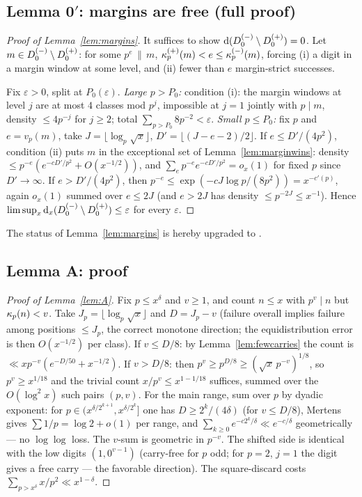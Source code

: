 \subsection{Lemma 0$'$: margins are free (full proof)}

\begin{proof}[Proof of Lemma~\ref{lem:margins}]
It suffices to show $\operatorname{d}(D_0^{(-)}\setminus D_0^{(+)})=0$. Let
$m\in D_0^{(-)}\setminus D_0^{(+)}$: for some $p^{e}\,\|\,m$,
$\kappa^{(+)}_p(m)<e\le\kappa^{(-)}_p(m)$, forcing (i) a digit in a margin
window at some level, and (ii) fewer than $e$ margin-strict successes.

Fix $\varepsilon>0$, split at $P_0(\varepsilon)$.
\emph{Large $p>P_0$:} condition (i): the margin windows at level $j$
are at most $4$ classes mod $p^{j}$, impossible at $j=1$ jointly with
$p\mid m$, density $\le4p^{-j}$ for $j\ge2$; total
$\sum_{p>P_0}8p^{-2}<\varepsilon$.
\emph{Small $p\le P_0$:} fix $p$ and $e=v_p(m)$, take
$J=\lfloor\log_p\sqrt x\rfloor$, $D'=\lfloor(J-e-2)/2\rfloor$. If
$e\le D'/(4p^{2})$, condition (ii) puts $m$ in the exceptional set of
Lemma~\ref{lem:marginwins}: density $\le
p^{-e}(e^{-cD'/p^{2}}+O(x^{-1/2}))$, and $\sum_{e}p^{-e}e^{-cD'/p^2}
=o_x(1)$ for fixed $p$ since $D'\to\infty$. If $e>D'/(4p^{2})$, then
$p^{-e}\le\exp(-cJ\log p/(8p^{2}))=x^{-c'(p)}$, again $o_x(1)$ summed
over $e\le2J$ (and $e>2J$ has density $\le p^{-2J}\le x^{-1}$).
Hence $\limsup_x\operatorname{d}_x(D_0^{(-)}\setminus D_0^{(+)})\le\varepsilon$ for every
$\varepsilon$.
\end{proof}

\noindent The status of Lemma~\ref{lem:margins} is hereby upgraded to
\statusP.

\subsection{Lemma A: proof}

\begin{proof}[Proof of Lemma~\ref{lem:A}]
Fix $p\le x^{\delta}$ and $v\ge1$, and count $n\le x$ with
$p^{v}\mid n$ but $\kappa_p(n)<v$. Take $J_p=\lfloor\log_p\sqrt
x\rfloor$ and $D=J_p-v$ (failure overall implies failure among
positions $\le J_p$, the correct monotone direction; the
equidistribution error is then $O(x^{-1/2})$ per class). If
$v\le D/8$: by Lemma~\ref{lem:fewcarries} the count is $\ll
xp^{-v}(e^{-D/50}+x^{-1/2})$. If $v>D/8$: then
$p^{v}\ge p^{D/8}\ge(\sqrt x\,p^{-v})^{1/8}$, so $p^{v}\ge x^{1/18}$
and the trivial count $x/p^{v}\le x^{1-1/18}$ suffices, summed over
the $O(\log^2x)$ such pairs $(p,v)$. For the main range, sum over
$p$ by dyadic exponent: for $p\in(x^{\delta/2^{k+1}},x^{\delta/2^{k}}]$
one has $D\ge2^{k}/(4\delta)$ (for $v\le D/8$), Mertens gives
$\sum1/p=\log2+o(1)$ per range, and
$\sum_{k\ge0}e^{-c2^{k}/\delta}\ll e^{-c/\delta}$ geometrically ---
no $\log\log$ loss. The $v$-sum is geometric in $p^{-v}$. The shifted
side is identical with the low digits $(1,0^{v-1})$ (carry-free for
$p$ odd; for $p=2$, $j=1$ the digit gives a free carry --- the
favorable direction). The square-discard costs
$\sum_{p>x^{\delta}}x/p^{2}\ll x^{1-\delta}$.
\end{proof}

